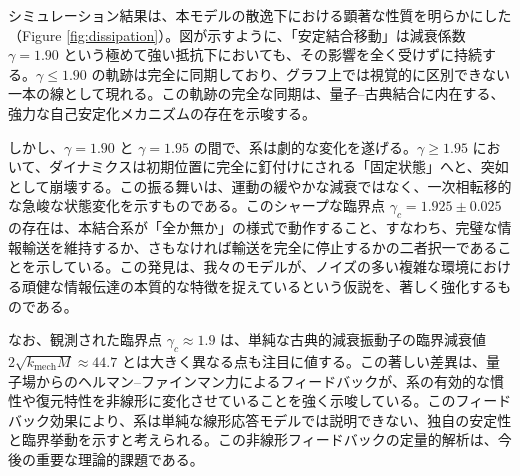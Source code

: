 \documentclass[a4paper,11pt,ja=standard]{bxjsarticle}
\begin{document}
シミュレーション結果は、本モデルの散逸下における顕著な性質を明らかにした（Figure \ref{fig:dissipation}）。図が示すように、「安定結合移動」は減衰係数 $\gamma = 1.90$ という極めて強い抵抗下においても、その影響を全く受けずに持続する。$\gamma \le 1.90$ の軌跡は完全に同期しており、グラフ上では視覚的に区別できない一本の線として現れる。この軌跡の完全な同期は、量子–古典結合に内在する、強力な自己安定化メカニズムの存在を示唆する。

しかし、$\gamma = 1.90$ と $\gamma = 1.95$ の間で、系は劇的な変化を遂げる。$\gamma \ge 1.95$ において、ダイナミクスは初期位置に完全に釘付けにされる「固定状態」へと、突如として崩壊する。この振る舞いは、運動の緩やかな減衰ではなく、一次相転移的な急峻な状態変化を示すものである。このシャープな臨界点 $\gamma_c = 1.925 \pm 0.025$ の存在は、本結合系が「全か無か」の様式で動作すること、すなわち、完璧な情報輸送を維持するか、さもなければ輸送を完全に停止するかの二者択一であることを示している。この発見は、我々のモデルが、ノイズの多い複雑な環境における頑健な情報伝達の本質的な特徴を捉えているという仮説を、著しく強化するものである。

なお、観測された臨界点 $\gamma_c \approx 1.9$ は、単純な古典的減衰振動子の臨界減衰値 $2\sqrt{k_{\text{mech}}M} \approx 44.7$ とは大きく異なる点も注目に値する。この著しい差異は、量子場からのヘルマン–ファインマン力によるフィードバックが、系の有効的な慣性や復元特性を非線形に変化させていることを強く示唆している。このフィードバック効果により、系は単純な線形応答モデルでは説明できない、独自の安定性と臨界挙動を示すと考えられる。この非線形フィードバックの定量的解析は、今後の重要な理論的課題である。
\FloatBarrier
\end{document}
